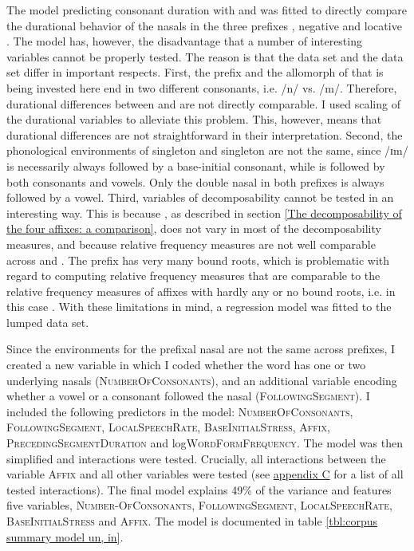 The model predicting consonant duration with  and  was fitted to directly compare the durational behavior of the nasals in the three prefixes , negative  and locative . The model has, however, the disadvantage that a number of interesting variables cannot be properly tested. The reason is that the  data set and the data set differ in important respects.
First, the prefix  and the allomorph of  that is being invested here end in two different consonants, i.e.  /n/ vs. /m/. Therefore, durational differences between  and  are not directly comparable. I  used scaling of the durational variables to alleviate this problem. This, however, means that durational differences are not straightforward in their interpretation. 
Second, the phonological environments of singleton  and singleton  are not the same, since /ɪm/ is necessarily always followed by a base-initial consonant, while  is followed by both consonants and vowels. Only the double nasal in both prefixes is always followed by a vowel.
Third, variables of decomposability  cannot be tested in an interesting way. This is because , as described in section \ref{The decomposability of the four affixes: a comparison}, does not vary in most of the decomposability measures, and because relative frequency measures are not well comparable across  and . The prefix  has very many bound roots, which is problematic with regard to computing relative frequency measures that are comparable to the relative frequency measures of affixes with hardly any or no bound roots, i.e. in this case . 
With these limitations in mind, a regression model was fitted to the lumped data set.  

Since the environments for the prefixal nasal are not the same across prefixes, I created a new variable in which I coded whether the word has one or two underlying nasals (\textsc{NumberOfConsonants}), and an additional variable encoding whether a vowel or a consonant followed the nasal (\textsc{FollowingSegment}). I included the following predictors in the model: \textsc{NumberOfConsonants}, \textsc{FollowingSegment}, \textsc{LocalSpeechRate},  \textsc{BaseInitialStress}, \textsc{Affix}, \textsc{PrecedingSegmentDuration} and log\textsc{WordFormFrequency}.
The model was then simplified and interactions were tested. Crucially, all interactions between the variable \textsc{Affix} and all other variables were tested (see \hyperref[Appendix C: Summaries of tested interactions in corpus study]{appendix C} for a list of all tested interactions). 
The final model explains 49\% of the variance and features five variables, \textsc{Number-OfConsonants}, \textsc{FollowingSegment}, \textsc{LocalSpeechRate}, \textsc{BaseInitialStress} and \textsc{Affix}. The model is documented in table \ref{tbl:corpus summary model un, in}.





